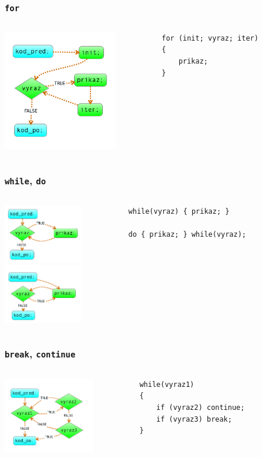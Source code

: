 \begin{frame}[fragile]
	\frametitle{\texttt{for}}
	\begin{columns}
	\column{50mm}
		\includegraphics[width=50mm]{img/for.png}
	\column{6cm}
		\begin{verbatim}
		for (init; vyraz; iter)
		{
		    prikaz;
		}
		\end{verbatim}
	\end{columns}
\end{frame}

\begin{frame}[fragile]
	\frametitle{\texttt{while}, \texttt{do}}
	\begin{columns}
	\column{50mm}
		\includegraphics[width=35mm]{img/while.png}\\
		\includegraphics[width=35mm]{img/do.png}
	\column{6cm}
		\begin{verbatim}
		while(vyraz) { prikaz; }

		do { prikaz; } while(vyraz);
		\end{verbatim}
	\end{columns}
\end{frame}

\begin{frame}[fragile]
	\frametitle{\texttt{break}, \texttt{continue}}
	\begin{columns}
	\column{50mm}
		\includegraphics[width=40mm]{img/break.png}
	\column{6cm}
		\begin{verbatim}
		while(vyraz1) 
		{ 
		    if (vyraz2) continue;
		    if (vyraz3) break;
		}
		\end{verbatim}
	\end{columns}
\end{frame}


